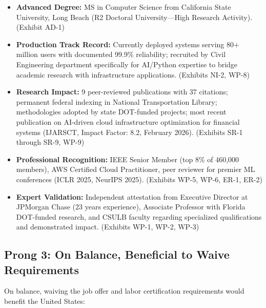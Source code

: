 \documentclass[11pt]{article}
\begin{document}
\begin{itemize}
    \item \textbf{Advanced Degree:} MS in Computer Science from California State University, Long Beach (R2 Doctoral University—High Research Activity). (Exhibit AD-1)
    
    \item \textbf{Production Track Record:} Currently deployed systems serving 80+ million users with documented 99.9\% reliability; recruited by Civil Engineering department specifically for AI/Python expertise to bridge academic research with infrastructure applications. (Exhibits NI-2, WP-8)
    
    \item \textbf{Research Impact:} 9 peer-reviewed publications with 37 citations; permanent federal indexing in National Transportation Library; methodologies adopted by state DOT-funded projects; most recent publication on AI-driven cloud infrastructure optimization for financial systems (IJARSCT, Impact Factor: 8.2, February 2026). (Exhibits SR-1 through SR-9, WP-9)
    
    \item \textbf{Professional Recognition:} IEEE Senior Member (top 8\% of 460,000 members), AWS Certified Cloud Practitioner, peer reviewer for premier ML conferences (ICLR 2025, NeurIPS 2025). (Exhibits WP-5, WP-6, ER-1, ER-2)
    
    \item \textbf{Expert Validation:} Independent attestation from Executive Director at JPMorgan Chase (23 years experience), Associate Professor with Florida DOT-funded research, and CSULB faculty regarding specialized qualifications and demonstrated impact. (Exhibits WP-1, WP-2, WP-3)
\end{itemize}

\subsection{Prong 3: On Balance, Beneficial to Waive Requirements}

On balance, waiving the job offer and labor certification requirements would benefit the United States:
\end{document}
